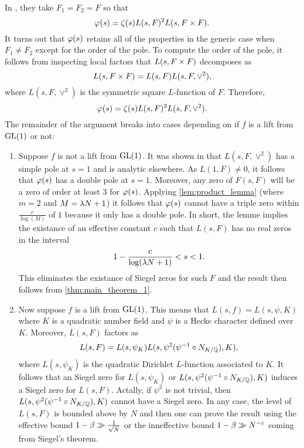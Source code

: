 \documentclass[12pt,reqno,oneside]{amsart}
\begin{document}
    In \cite{GHL}, they take $F_{1} = F_{2} = F$ so that
    \[
        \varphi(s) = \zeta(s)L(s,F)^{2}L(s,F \times F).
    \]
    It turns out that $\varphi(s)$ retains all of the properties in the generic case when $F_{1} \neq F_{2}$ except for the order of the pole. To compute the order of the pole, it follows from inspecting local factors that $L(s,F \times F)$ decomposes as
    \[
        L(s,F \times F) = L(s,F)L(s,F,\vee^{2}),
    \]
    where $L(s,F,\vee^{2})$ is the symmetric square $L$-function of $F$. Therefore,
    \[
        \varphi(s) = \zeta(s)L(s,F)^{3}L(s,F,\vee^{2}).
    \]
    The remainder of the argument breaks into cases depending on if $f$ is a lift from $\mathrm{GL}(1)$ or not:
    \begin{enumerate}[label=(\roman*)]
        \item Suppose $f$ is not a lift from $\mathrm{GL}(1)$. It was shown in \cite{BG} that $L(s,F,\vee^{2})$ has a simple pole at $s = 1$ and is analytic elsewhere. As $L(1,F) \neq 0$, it follows that $\varphi(s)$ has a double pole at $s = 1$. Moreover, any zero of $F(s,F)$ will be a zero of order at least $3$ for $\varphi(s)$. Applying \cref{lem:product_lemma} (where $m = 2$ and $M = \lambda N+1$) it follows that $\varphi(s)$ cannot have a triple zero within $\frac{c}{\log(M)}$ of $1$ because it only has a double pole. In short, the lemme implies the existance of an effective constant $c$ such that $L(s,F)$ has no real zeros in the interval
        \[
            1-\frac{c}{\log(\lambda N+1)} < s < 1.
        \]
        This eliminates the existance of Siegel zeros for such $F$ and the result then follows from \cref{thm:main_theorem_1}.
        \item Now suppose $f$ is a lift from $\mathrm{GL}(1)$. This means that $L(s,f) = L(s,\psi,K)$ where $K$ is a quadratic number field and $\psi$ is a Hecke character defined over $K$. Moreover, $L(s,F)$ factors as
        \[
            L(s,F) = L(s,\psi_{K})L(s,\psi^{2}(\psi^{-1} \circ N_{K/\mathbb{Q}}),K),
        \]
        where $L(s,\psi_{K})$ is the quadratic Dirichlet $L$-function associated to $K$. It follows that an Siegel zero for $L(s,\psi_{K})$ or $L(s,\psi^{2}(\psi^{-1} \circ N_{K/\mathbb{Q}}),K)$ induces a Siegel zero for $L(s,F)$. Actally, if $\psi^{2}$ is not trivial, then $L(s,\psi^{2}(\psi^{-1} \circ N_{K/\mathbb{Q}}),K)$ cannot have a Siegel zero. In any case, the level of $L(s,F)$ is bounded above by $N$ and then one can prove the result using the effective bound $1-\beta \gg \frac{1}{\sqrt{N}}$ or the inneffective bound $1-\beta \gg N^{-\varepsilon}$ coming from Siegel's theorem.
    \end{enumerate}
\end{document}
